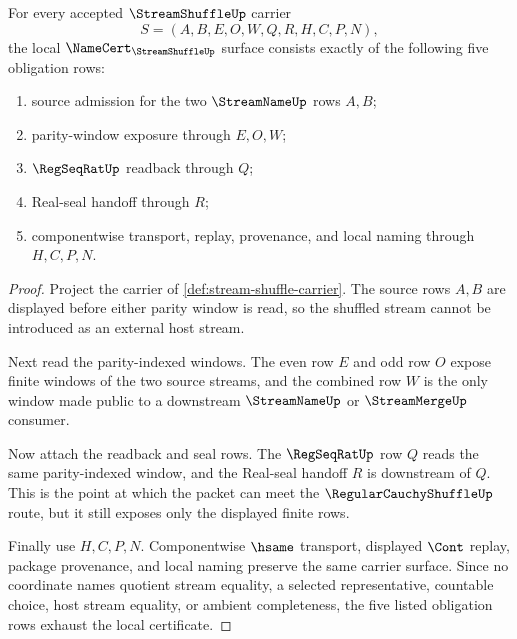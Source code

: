 \begin{theorem}
\label{thm:stream-shuffle-namecert-obligations}
For every accepted $\StreamShuffleUp$ carrier
$$
S=(A,B,E,O,W,Q,R,H,C,P,N),
$$
the local $\NameCert_{\StreamShuffleUp}$ surface consists exactly of the
following five obligation rows:
\begin{enumerate}
\item source admission for the two $\StreamNameUp$ rows $A,B$;
\item parity-window exposure through $E,O,W$;
\item $\RegSeqRatUp$ readback through $Q$;
\item Real-seal handoff through $R$;
\item componentwise transport, replay, provenance, and local naming through
$H,C,P,N$.
\end{enumerate}
\end{theorem}
\begin{proof}
Project the carrier of \autoref{def:stream-shuffle-carrier}. The source rows
$A,B$ are displayed before either parity window is read, so the shuffled
stream cannot be introduced as an external host stream.

Next read the parity-indexed windows. The even row $E$ and odd row $O$ expose
finite windows of the two source streams, and the combined row $W$ is the only
window made public to a downstream $\StreamNameUp$ or $\StreamMergeUp$
consumer.

Now attach the readback and seal rows. The $\RegSeqRatUp$ row $Q$ reads the
same parity-indexed window, and the Real-seal handoff $R$ is downstream of
$Q$. This is the point at which the packet can meet the
$\RegularCauchyShuffleUp$ route, but it still exposes only the displayed
finite rows.

Finally use $H,C,P,N$. Componentwise $\hsame$ transport, displayed $\Cont$
replay, package provenance, and local naming preserve the same carrier
surface. Since no coordinate names quotient stream equality, a selected
representative, countable choice, host stream equality, or ambient
completeness, the five listed obligation rows exhaust the local certificate.
\end{proof}

